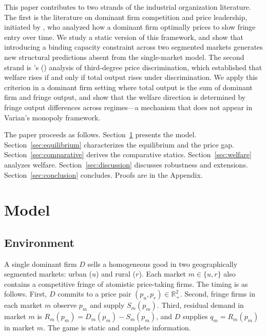 \documentclass[12pt]{article}
\theoremstyle{plain}
\theoremstyle{definition}
\theoremstyle{remark}
\begin{document}
This paper contributes to two strands of the industrial organization literature.
The first is the literature on dominant firm competition and price leadership,
initiated by \citet{Gaskins1971}, who analyzed how a dominant firm optimally
prices to slow fringe entry over time.  We study a static version of this
framework, and show that introducing a binding capacity constraint across two
segmented markets generates new structural predictions absent from the
single-market model.  The second strand is \citeauthor{Varian1985}'s
(\citeyear{Varian1985}) analysis of third-degree price discrimination, which
established that welfare rises if and only if total output rises under
discrimination.  We apply this criterion in a dominant firm setting where total
output is the sum of dominant firm and fringe output, and show that the welfare
direction is determined by fringe output differences across regimes---a
mechanism that does not appear in Varian's monopoly framework.

The paper proceeds as follows.  Section~\ref{sec:model} presents the model.
Section~\ref{sec:equilibrium} characterizes the equilibrium and the price gap.
Section~\ref{sec:comparative} derives the comparative statics.
Section~\ref{sec:welfare} analyzes welfare.  Section~\ref{sec:discussion}
discusses robustness and extensions.  Section~\ref{sec:conclusion} concludes.
Proofs are in the Appendix.

\section{Model}
\label{sec:model}

\subsection{Environment}

A single dominant firm $D$ sells a homogeneous good in two geographically
segmented markets: urban ($u$) and rural ($r$).  Each market $m \in \{u,r\}$
also contains a competitive fringe of atomistic price-taking firms.  The timing
is as follows.  First, $D$ commits to a price pair $(p_u, p_r) \in \mathbb{R}_+^2$.
Second, fringe firms in each market $m$ observe $p_m$ and supply $S_m(p_m)$.
Third, residual demand in market $m$ is $R_m(p_m) = D_m(p_m) - S_m(p_m)$, and
$D$ supplies $q_m = R_m(p_m)$ in market $m$.  The game is static and complete
information.
\end{document}
